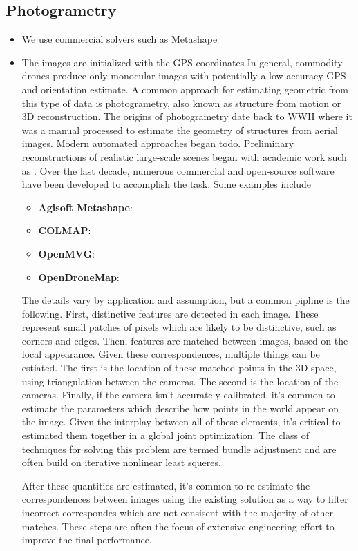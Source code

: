 \subsection{Photogrametry}
\begin{itemize}
    \item We use commercial solvers such as Metashape
    \item The images are initialized with the GPS coordinates
In general, commodity drones produce only monocular images with potentially a low-accuracy GPS and orientation estimate. A common approach for estimating geometric from this type of data is photogrametry, also known as structure from motion or 3D reconstruction. The origins of photogrametry date back to WWII where it was a manual processed to estimate the geometry of structures from aerial images. Modern automated approaches began todo. Preliminary reconstructions of realistic large-scale scenes began with academic work such as \cite{Agarwal2009}. Over the last decade, numerous commercial and open-source software have been developed to accomplish the task. Some examples include
\begin{itemize}
    \item \textbf{Agisoft Metashape}:
    \item \textbf{COLMAP}:
    \item \textbf{OpenMVG}:
    \item \textbf{OpenDroneMap}:
\end{itemize}

The details vary by application and assumption, but a common pipline is the following. First, distinctive features are detected in each image. These represent small patches of pixels which are likely to be distinctive, such as corners and edges. Then, features are matched between images, based on the local appearance. 
Given these correspondences, multiple things can be estiated. The first is the location of these matched points in the 3D space, using triangulation between the cameras. The second is the location of the cameras. Finally, if the camera isn't accurately calibrated, it's common to estimate the parameters which describe how points in the world appear on the image. Given the interplay between all of these elements, it's critical to estimated them together in a global joint optimization. The class of techniques for solving this problem are termed bundle adjustment and are often build on iterative nonlinear least squeres. 

After these quantities are estimated, it's common to re-estimate the correspondences between images using the existing solution as a way to filter incorrect correspondes which are not consisent with the majority of other matches. These steps are often the focus of extensive engineering effort to improve the final performance. 


\end{itemize}
